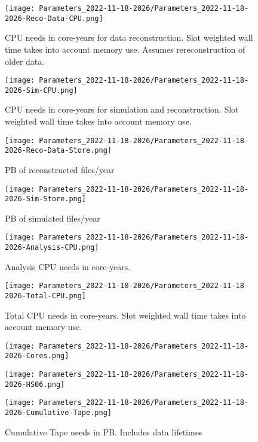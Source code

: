\begin{figure}[h]
\centering\texttt{[image: Parameters\_2022-11-18-2026/Parameters\_2022-11-18-2026-Reco-Data-CPU.png]}\label{fig:Reco-Data-CPU}
\caption{CPU needs in core-years for data reconstruction.              Slot weighted wall time takes into account memory use.  Assumes rereconstruction of older data.}
\end{figure}
\begin{figure}[h]
\centering\texttt{[image: Parameters\_2022-11-18-2026/Parameters\_2022-11-18-2026-Sim-CPU.png]}\label{fig:Sim-CPU}
\caption{CPU needs in core-years for simulation and reconstruction.              Slot weighted wall time takes into account memory use.}
\end{figure}
\begin{figure}[h]
\centering\texttt{[image: Parameters\_2022-11-18-2026/Parameters\_2022-11-18-2026-Reco-Data-Store.png]}\label{fig:Reco-Data-Store}
\caption{PB of reconstructed files/year}
\end{figure}
\begin{figure}[h]
\centering\texttt{[image: Parameters\_2022-11-18-2026/Parameters\_2022-11-18-2026-Sim-Store.png]}\label{fig:Sim-Store}
\caption{PB of simulated files/year}
\end{figure}
\begin{figure}[h]
\centering\texttt{[image: Parameters\_2022-11-18-2026/Parameters\_2022-11-18-2026-Analysis-CPU.png]}\label{fig:Analysis-CPU}
\caption{Analysis CPU needs in core-years.}
\end{figure}
\begin{figure}[h]
\centering\texttt{[image: Parameters\_2022-11-18-2026/Parameters\_2022-11-18-2026-Total-CPU.png]}\label{fig:Total-CPU}
\caption{Total CPU needs in core-years. Slot weighted wall time takes into account memory use.}
\end{figure}
\begin{figure}[h]
\centering\texttt{[image: Parameters\_2022-11-18-2026/Parameters\_2022-11-18-2026-Cores.png]}\label{fig:Cores}
\caption{}
\end{figure}
\begin{figure}[h]
\centering\texttt{[image: Parameters\_2022-11-18-2026/Parameters\_2022-11-18-2026-HS06.png]}\label{fig:HS06}
\caption{}
\end{figure}
\begin{figure}[h]
\centering\texttt{[image: Parameters\_2022-11-18-2026/Parameters\_2022-11-18-2026-Cumulative-Tape.png]}\label{fig:Cumulative-Tape}
\caption{Cumulative Tape needs in PB. Includes data lifetimes}
\end{figure}
